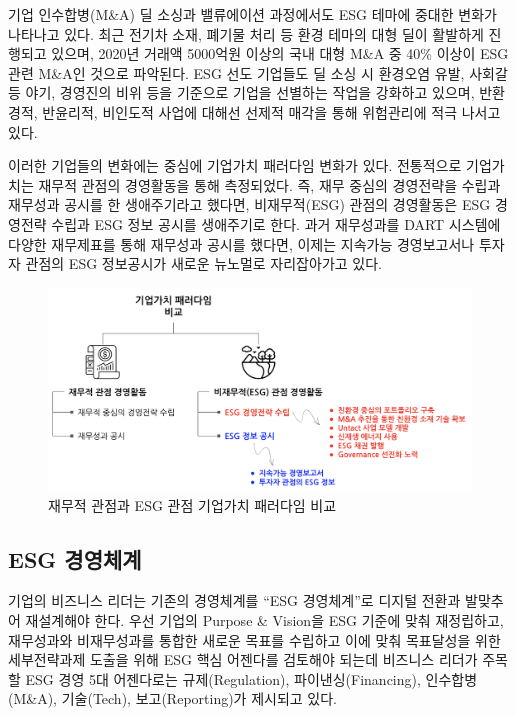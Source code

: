 \documentclass[smallextended]{svjour3}       %
\begin{document}
기업 인수합병(M\&A) 딜 소싱과 밸류에이션 과정에서도 ESG 테마에 중대한
변화가 나타나고 있다. 최근 전기차 소재, 폐기물 처리 등 환경 테마의 대형
딜이 활발하게 진행되고 있으며, 2020년 거래액 5000억원 이상의 국내 대형
M\&A 중 40\% 이상이 ESG 관련 M\&A인 것으로 파악된다. ESG 선도 기업들도
딜 소싱 시 환경오염 유발, 사회갈등 야기, 경영진의 비위 등을 기준으로
기업을 선별하는 작업을 강화하고 있으며, 반환경적, 반윤리적, 비인도적
사업에 대해선 선제적 매각을 통해 위험관리에 적극 나서고 있다.

이러한 기업들의 변화에는 중심에 기업가치 패러다임 변화가 있다.
전통적으로 기업가치는 재무적 관점의 경영활동을 통해 측정되었다. 즉, 재무
중심의 경영전략을 수립과 재무성과 공시를 한 생애주기라고 했다면,
비재무적(ESG) 관점의 경영활동은 ESG 경영전략 수립과 ESG 정보 공시를
생애주기로 한다. 과거 재무성과를 DART 시스템에 다양한 재무제표를 통해
재무성과 공시를 했다면, 이제는 지속가능 경영보고서나 투자자 관점의 ESG
정보공시가 새로운 뉴노멀로 자리잡아가고 있다.

\begin{figure}

{\centering \includegraphics[width=1\linewidth]{fig/esg-comparison} 

}

\caption{재무적 관점과 ESG 관점 기업가치 패러다임 비교}\label{fig:esg-paradigm}
\end{figure}

\hypertarget{esg-mgmt-framework}{%
\subsection{ESG 경영체계}\label{esg-mgmt-framework}}

기업의 비즈니스 리더는 기존의 경영체계를 ``ESG 경영체계''로 디지털
전환과 발맞추어 재설계해야 한다. 우선 기업의 Purpose \& Vision을 ESG
기준에 맞춰 재정립하고, 재무성과와 비재무성과를 통합한 새로운 목표를
수립하고 이에 맞춰 목표달성을 위한 세부전략과제 도출을 위해 ESG 핵심
어젠다를 검토해야 되는데 비즈니스 리더가 주목할 ESG 경영 5대 어젠다로는
규제(Regulation), 파이낸싱(Financing), 인수합병(M\&A), 기술(Tech),
보고(Reporting)가 제시되고 있다.
\end{document}
